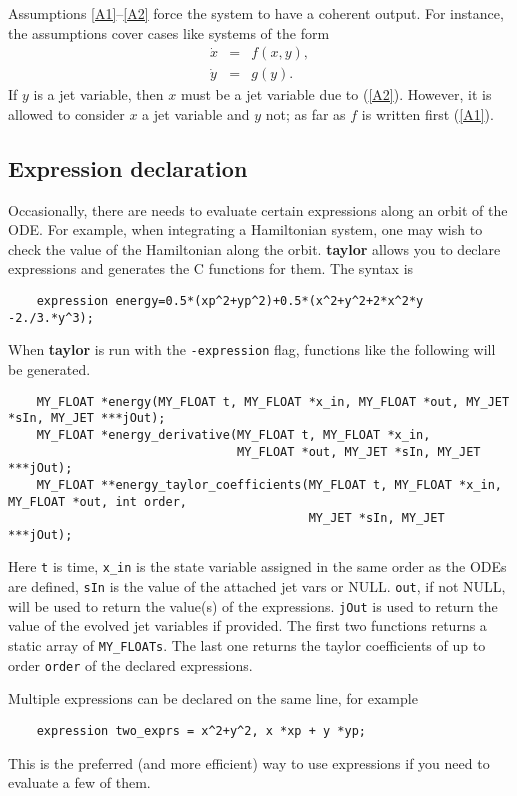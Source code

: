 \documentclass[10pt]{article}
\theoremstyle{remark}
\newcommand{\taylorname}{{\bf taylor}}
\begin{document}
Assumptions \ref{A1}--\ref{A2} force the system to have a coherent
output. For instance, the assumptions cover cases like systems of the
form
\begin{eqnarray*}
    \dot x &=& f(x,y), \\
    \dot y &=& g(y).
\end{eqnarray*}
If $y$ is a jet variable, then $x$ must be a jet variable due to
(\ref{A2}). However, it is allowed to consider $x$ a jet variable and
$y$ not; as far as $f$ is written first (\ref{A1}).

\iftrue
\subsection*{Expression declaration}
Occasionally, there are needs to evaluate certain expressions along an orbit of the ODE. For example,
when integrating a Hamiltonian system, one may wish to check the value of the Hamiltonian along the orbit.
\taylorname{} allows you to declare expressions and generates the C functions for them.  The syntax is
\begin{verbatim}
    expression energy=0.5*(xp^2+yp^2)+0.5*(x^2+y^2+2*x^2*y -2./3.*y^3);
\end{verbatim}

When \taylorname{} is run with the \verb+-expression+ flag, functions like the following will be generated.
\begin{verbatim}    
    MY_FLOAT *energy(MY_FLOAT t, MY_FLOAT *x_in, MY_FLOAT *out, MY_JET *sIn, MY_JET ***jOut);
    MY_FLOAT *energy_derivative(MY_FLOAT t, MY_FLOAT *x_in, 
                                MY_FLOAT *out, MY_JET *sIn, MY_JET ***jOut);
    MY_FLOAT **energy_taylor_coefficients(MY_FLOAT t, MY_FLOAT *x_in, MY_FLOAT *out, int order,
                                          MY_JET *sIn, MY_JET ***jOut);
\end{verbatim}
Here \verb+t+ is time, \verb+x_in+ is the state variable assigned in the same order as the ODEs are defined,  \verb+sIn+ is the value of the attached jet vars or NULL. 
\verb+out+, if not NULL, will be used to return the value(s) of the expressions. \verb+jOut+ is used to return the value of the evolved jet variables if provided.
The first two functions returns a static array of \verb+MY_FLOATs+. The last one returns the taylor coefficients of up to order \verb+order+ of the declared expressions. 

\bigskip
Multiple expressions can be declared on the same line, for example
\begin{verbatim}
    expression two_exprs = x^2+y^2, x *xp + y *yp;
\end{verbatim}
This is the preferred (and more efficient) way to use expressions if you need to evaluate a few of them.
\fi
\end{document}

